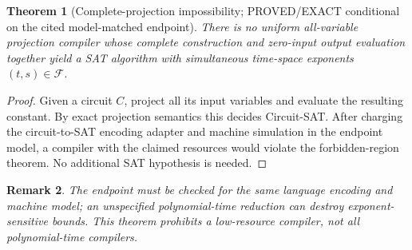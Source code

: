 \documentclass[11pt]{article}
\newtheorem{theorem}{Theorem}[section]
\newtheorem{remark}[theorem]{Remark}
\begin{document}
\begin{theorem}[Complete-projection impossibility; PROVED/EXACT
conditional on the cited model-matched endpoint]
There is no uniform all-variable projection compiler whose complete
construction and zero-input output evaluation together yield a SAT
algorithm with simultaneous time-space exponents $(t,s)\in\mathcal F$.
\end{theorem}
\begin{proof}
Given a circuit $C$, project all its input variables and evaluate the
resulting constant. By exact projection semantics this decides
Circuit-SAT. After charging the circuit-to-SAT encoding adapter and
machine simulation in the endpoint model, a compiler with the
claimed resources would violate the forbidden-region theorem.
No additional SAT hypothesis is needed.
\end{proof}
\begin{remark}
The endpoint must be checked for the \emph{same language encoding and
machine model}; an unspecified polynomial-time reduction can destroy
exponent-sensitive bounds. This theorem prohibits a low-resource
compiler, not all polynomial-time compilers.
\end{remark}
\end{document}
